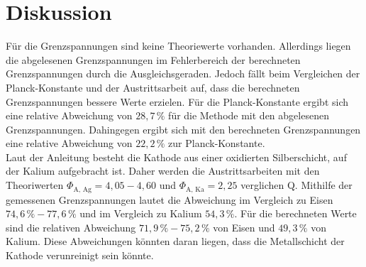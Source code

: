 \section{Diskussion}
\label{sec:Diskussion}
Für die Grenzspannungen sind keine Theoriewerte vorhanden. Allerdings liegen die abgelesenen Grenzspannungen
im Fehlerbereich der berechneten Grenzspannungen durch die Ausgleichsgeraden. Jedoch fällt beim Vergleichen der 
Planck-Konstante und der Austrittsarbeit auf, dass die berechneten Grenzspannungen bessere Werte erzielen.
Für die Planck-Konstante ergibt sich eine relative Abweichung von $28,7\,\%$ für die Methode mit den abgelesenen Grenzspannungen.
Dahingegen ergibt sich mit den berechneten Grenzspannungen eine relative Abweichung von $22,2\,\%$ zur Planck-Konstante. \\Laut der Anleitung \cite{anleitungV500}
besteht die Kathode aus einer oxidierten Silberschicht, auf der Kalium aufgebracht ist. Daher werden die Austrittsarbeiten mit den Theoriwerten
$\Phi_{\text{A, Ag}} = 4,05 - 4,60$ und $\Phi_{\text{A, Ka}} = 2,25$ verglichen Q\cite{Austrittsarbeit}. Mithilfe der gemessenen Grenzspannungen lautet die Abweichung
im Vergleich zu Eisen $74,6\,\% - 77,6\,\%$ und im Vergleich zu Kalium $54,3\,\%$. Für die berechneten Werte sind die relativen Abweichung
$71,9\,\% - 75,2\,\%$ von Eisen und $49,3\,\%$ von Kalium. Diese Abweichungen könnten daran liegen, dass die Metallschicht der Kathode
verunreinigt sein könnte. 